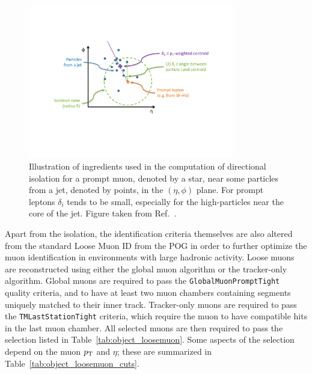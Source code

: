 \begin{figure}[tpb]
  \centering
  \includegraphics[width=0.8\textwidth]{figures/eventreco_objects/directional_iso_cartoon}
  \caption{Illustration of ingredients used in the computation of directional isolation for a prompt
muon, denoted by a star, near some particles from a jet, denoted by points, in the $(\eta,\phi)$
plane. For prompt leptons $\delta_i$ tends to be small, especially for the high-\pt particles near
the core of the jet. Figure taken from Ref.~\cite{CMS-AN2011-498}.
  \label{fig:object_directional_iso}}
\end{figure}

Apart from the isolation, the identification criteria themselves are also altered from the standard
Loose Muon ID from the POG in order to further optimize the muon identification in environments
with large hadronic activity. 
Loose muons are reconstructed using either the global muon algorithm or the tracker-only
algorithm. 
Global muons are required to pass the {\tt GlobalMuonPromptTight} quality criteria,
and to have at least two muon chambers containing segments uniquely matched to their inner track. 
Tracker-only muons are required to pass the {\tt TMLastStationTight} criteria, which require the
muon to have compatible hits in the last muon chamber. 
All selected muons are then required to pass the selection listed in
Table~\ref{tab:object_loosemuon}. 
Some aspects of the selection depend on the muon $p_{\mathrm{T}}$ and $\eta$; these are summarized in
Table~\ref{tab:object_loosemuon_cuts}.

